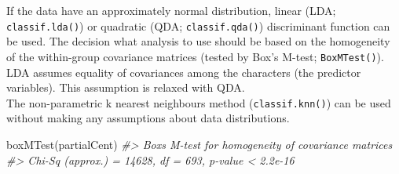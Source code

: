 \documentclass[
  11pt,
  a4paper]{article}
\newenvironment{Shaded}{\begin{snugshade}}{\end{snugshade}}
\newcommand{\CommentTok}[1]{\textcolor[rgb]{0.56,0.35,0.01}{\textit{#1}}}
\newcommand{\DecValTok}[1]{\textcolor[rgb]{0.00,0.00,0.81}{#1}}
\newcommand{\FloatTok}[1]{\textcolor[rgb]{0.00,0.00,0.81}{#1}}
\newcommand{\FunctionTok}[1]{\textcolor[rgb]{0.00,0.00,0.00}{#1}}
\newcommand{\NormalTok}[1]{#1}
\newcommand{\OtherTok}[1]{\textcolor[rgb]{0.56,0.35,0.01}{#1}}
\newcommand{\SpecialCharTok}[1]{\textcolor[rgb]{0.00,0.00,0.00}{#1}}
\newcommand{\StringTok}[1]{\textcolor[rgb]{0.31,0.60,0.02}{#1}}
\begin{document}
\begin{Shaded}
\end{Shaded}

If the data have an approximately normal distribution, linear (LDA;
\texttt{classif.lda()}) or quadratic (QDA; \texttt{classif.qda()})
discriminant function can be used. The decision what analysis to use
should be based on the homogeneity of the within-group covariance
matrices (tested by Box's M-test; \texttt{BoxMTest()}). LDA assumes
equality of covariances among the characters (the predictor variables).
This assumption is relaxed with QDA.\\
The non-parametric k nearest neighbours method (\texttt{classif.knn()})
can be used without making any assumptions about data distributions.

\begin{Shaded}
\begin{Highlighting}[]
\FunctionTok{boxMTest}\NormalTok{(partialCent)}
\CommentTok{\#\textgreater{} Box\textquotesingle{}s M{-}test for homogeneity of covariance matrices}
\CommentTok{\#\textgreater{}  Chi{-}Sq (approx.) = 14628, df = 693, p{-}value \textless{} 2.2e{-}16}
\end{Highlighting}
\end{Shaded}
\end{document}
